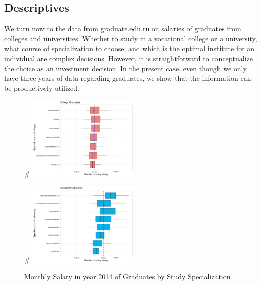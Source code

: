 \documentclass[alpha-refs]{wiley-article-05g}
\begin{document}
\subsection{Descriptives}

We turn now to the data from graduate.edu.ru on salaries of graduates from colleges and universities. Whether to study in a vocational college or a university, what course of specialization to choose, and which is the optimal institute for an individual are complex decisions. However, it is straightforward to conceptualize the choice as an investment decision. In the present case, even though we only have three years of data regarding graduates, we show that the information can be productively utilized. 

\begin{figure}[htbp!]
	\begin{minipage}[b]{.5\linewidth}
		\centering
		#\hspace*{-0.2in}
		\includegraphics[width=150pt]{sal_spnc.png}
	\end{minipage}
	\hfill
	\begin{minipage}[b]{.5\linewidth}
		\centering
		#\hspace*{-0.2in}
		\includegraphics[width=150pt]{sal_spnu.png}
	\end{minipage}
	\caption{Monthly Salary in year 2014 of Graduates by Study Specialization}\label{fig:1.6}
\end{figure}
\end{document}
